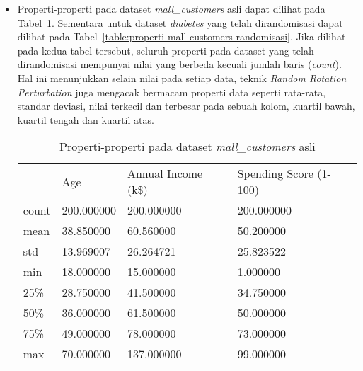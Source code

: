 \begin{itemize}
	\item Properti-properti pada dataset \textit{mall\_customers} asli dapat dilihat pada Tabel~\ref{table:properti-mall-customers-asli}. Sementara untuk dataset \textit{diabetes} yang telah dirandomisasi dapat dilihat pada Tabel~\ref{table:properti-mall-customers-randomisasi}. Jika dilihat pada kedua tabel tersebut, seluruh properti pada dataset yang telah dirandomisasi mempunyai nilai yang berbeda kecuali jumlah baris (\textit{count}). Hal ini menunjukkan selain nilai pada setiap data, teknik \textit{Random Rotation Perturbation} juga mengacak bermacam properti data seperti rata-rata, standar deviasi, nilai terkecil dan terbesar pada sebuah kolom, kuartil bawah, kuartil tengah dan kuartil atas.


	\begin{table}
		\centering
		\caption{Properti-properti pada dataset \textit{mall\_customers} asli}
		\begin{tabular}{l|lll}
			\hline
			& Age & Annual Income (k\$) & Spending Score (1-100) \\ 
	 count& 200.000000 & 200.000000 & 200.000000 \\
	 mean & 38.850000 & 60.560000 & 50.200000 \\
	 std & 13.969007 & 26.264721 & 25.823522 \\
	 min & 18.000000 & 15.000000 & 1.000000 \\
	 25\% & 28.750000 & 41.500000 & 34.750000 \\
	 50\% & 36.000000 & 61.500000 & 50.000000 \\
	 75\% & 49.000000 & 78.000000 & 73.000000 \\
	 max & 70.000000 & 137.000000 & 99.000000 \\
			\hline
		\end{tabular}
		\label{table:properti-mall-customers-asli}
	\end{table}
	

\end{itemize}
